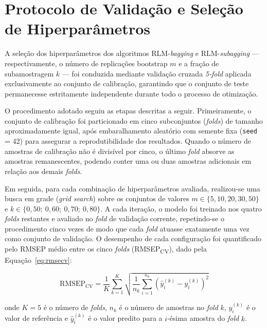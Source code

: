 \section{Protocolo de Validação e Seleção de Hiperparâmetros}
\label{sec:protocolo}

A seleção dos hiperparâmetros dos algoritmos RLM-\textit{bagging} e 
RLM-\textit{subagging} --- respectivamente, o número de replicações 
bootstrap $m$ e a fração de subamostragem $k$ --- foi conduzida 
mediante validação cruzada \textit{5-fold} aplicada exclusivamente 
ao conjunto de calibração, garantindo que o conjunto de teste 
permanecesse estritamente independente durante todo o processo de 
otimização.

O procedimento adotado seguiu as etapas descritas a seguir. 
Primeiramente, o conjunto de calibração foi particionado em cinco 
subconjuntos (\textit{folds}) de tamanho aproximadamente igual, 
após embaralhamento aleatório com semente fixa (\texttt{seed} = 42) 
para assegurar a reprodutibilidade dos resultados. Quando o número 
de amostras de calibração não é divisível por cinco, o último 
\textit{fold} absorve as amostras remanescentes, podendo conter uma 
ou duas amostras adicionais em relação aos demais \textit{folds}.

Em seguida, para cada combinação de hiperparâmetros avaliada, 
realizou-se uma busca em grade (\textit{grid search}) sobre os 
conjuntos de valores $m \in \{5, 10, 20, 30, 50\}$ e 
$k \in \{0{,}50;\ 0{,}60;\ 0{,}70;\ 0{,}80\}$. A cada iteração, 
o modelo foi treinado nos quatro \textit{folds} restantes e avaliado 
no \textit{fold} de validação corrente, repetindo-se o procedimento 
cinco vezes de modo que cada \textit{fold} atuasse exatamente uma vez 
como conjunto de validação. O desempenho de cada configuração foi quantificado pelo RMSEP médio entre os cinco \textit{folds} (RMSEP\textsubscript{CV}), dado pela Equação~\ref{eq:rmsecv}:

\begin{equation}
\label{eq:rmsecv}
\text{RMSEP}_{\text{CV}} = \frac{1}{K} \sum_{k=1}^{K}
\sqrt{\frac{1}{n_k} \sum_{i=1}^{n_k}
\left(\hat{y}_i^{(k)} - y_i^{(k)}\right)^2}
\end{equation}

\noindent onde $K = 5$ é o número de \textit{folds}, $n_k$ é o número 
de amostras no \textit{fold} $k$, $y_i^{(k)}$ é o valor de referência 
e $\hat{y}_i^{(k)}$ é o valor predito para a $i$-ésima amostra do 
\textit{fold} $k$.

